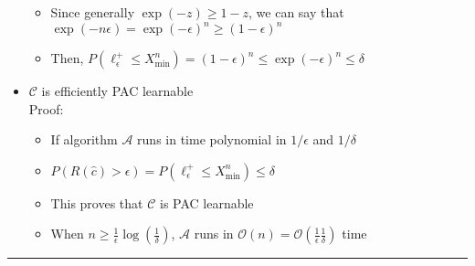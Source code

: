 \begin{itemize}
\begin{itemize}
        \item Since generally $\exp(-z) \geq 1-z$, we can say that $ \exp(-n \epsilon) = \exp(-\epsilon)^n \geq (1-\epsilon)^n$
        \item Then, $P(\ell^+_\epsilon \leq X_{\min}^n) = (1 - \epsilon)^n \leq \exp(-\epsilon)^n \leq \delta$
    \end{itemize}
    \item $\mathcal{C}$ is efficiently PAC learnable\\
    Proof:
    \begin{itemize}
        \item If algorithm $\mathcal{A}$ runs in time polynomial in $1/\epsilon$ and $1/\delta$
        \item $P(R(\hat{c}) > \epsilon) = P(\ell_\epsilon^+ \leq X_{\min}^n) \leq \delta$
        \item This proves that $\mathcal{C}$ is PAC learnable
        \item When $n \geq \frac{1}{\epsilon}\log(\frac{1}{\delta})$, $\mathcal{A}$ runs in $\mathcal{O}(n) = \mathcal{O}(\frac{1}{\epsilon}\frac{1}{\delta})$ time
    \end{itemize}
\end{itemize}

{\color{black}\hrule height 0.001mm}

